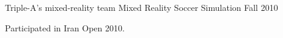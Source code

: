 \begin{cventries}
    \cventry
    {Triple-A's mixed-reality team} %
    {Mixed Reality Soccer Simulation} %
    {} %
    {Fall 2010} %
    {
      \begin{cvitems} %
        \item {Participated in Iran Open 2010.}
      \end{cvitems}
    }

\end{cventries}

